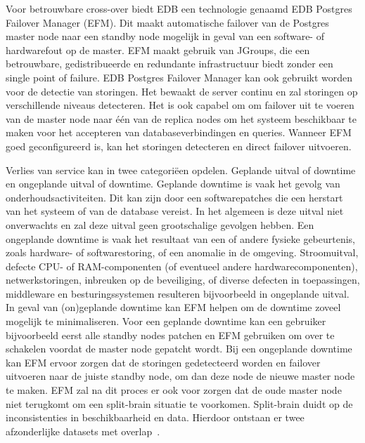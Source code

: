 Voor betrouwbare cross-over biedt EDB een technologie genaamd EDB Postgres Failover Manager (EFM). Dit maakt automatische failover van de Postgres master node naar een standby node mogelijk in geval van een software- of hardwarefout op de master. EFM maakt gebruik van JGroups, die een betrouwbare, gedistribueerde en redundante infrastructuur biedt zonder een single point of failure.
EDB Postgres Failover Manager kan ook gebruikt worden voor de detectie van storingen. Het bewaakt de server continu en zal storingen op verschillende niveaus detecteren. Het is ook capabel om om failover uit te voeren van de master node naar één van de replica nodes om het systeem beschikbaar te maken voor het accepteren van databaseverbindingen en queries. Wanneer EFM goed geconfigureerd is, kan het storingen detecteren en direct failover uitvoeren.

Verlies van service kan in twee categoriëen opdelen. Geplande uitval of downtime en ongeplande uitval of downtime.
Geplande downtime is vaak het gevolg van onderhoudsactiviteiten. Dit kan zijn door een softwarepatches die een herstart van het systeem of van de database vereist. In het algemeen is deze uitval niet onverwachts en zal deze uitval geen grootschalige gevolgen hebben.
Een ongeplande downtime is vaak het resultaat van een of andere fysieke gebeurtenis, zoals hardware- of softwarestoring, of een anomalie in de omgeving. Stroomuitval, defecte CPU- of RAM-componenten (of eventueel andere hardwarecomponenten), netwerkstoringen, inbreuken op de beveiliging, of diverse defecten in toepassingen, middleware en besturingssystemen resulteren bijvoorbeeld in ongeplande uitval.
In geval van (on)geplande downtime kan EFM helpen om de downtime zoveel mogelijk te minimaliseren. Voor een geplande downtime kan een gebruiker bijvoorbeeld eerst alle standby nodes patchen en EFM gebruiken om over te schakelen voordat de master node gepatcht wordt. Bij een ongeplande downtime kan EFM ervoor zorgen dat de storingen gedetecteerd worden en failover uitvoeren naar de juiste standby node, om dan deze node de nieuwe master node te maken. EFM zal na dit proces er ook voor zorgen dat de oude master node niet terugkomt om een split-brain situatie te voorkomen. Split-brain duidt op de inconsistenties in beschikbaarheid en data. Hierdoor ontstaan er twee afzonderlijke datasets met overlap~\autocite{Kumar2020}. %





